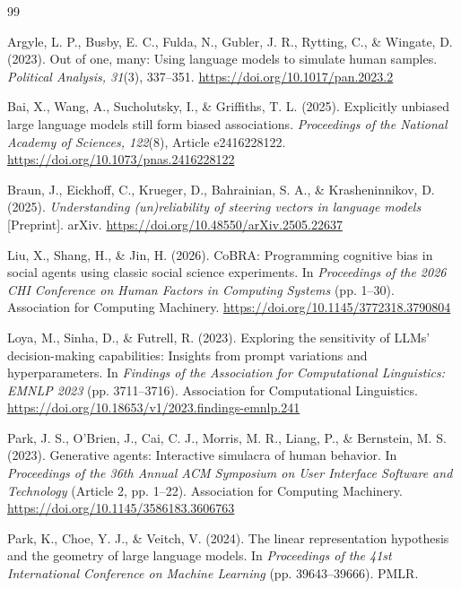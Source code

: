 \documentclass[onecolumn]{main}
\begin{document}
\begin{thebibliography}{99}
\setlength{\bibhang}{0.5in}

Argyle, L. P., Busby, E. C., Fulda, N., Gubler, J. R., Rytting, C., \& Wingate, D. (2023). Out of one, many: Using language models to simulate human samples. \textit{Political Analysis, 31}(3), 337--351. \url{https://doi.org/10.1017/pan.2023.2}

Bai, X., Wang, A., Sucholutsky, I., \& Griffiths, T. L. (2025). Explicitly unbiased large language models still form biased associations. \textit{Proceedings of the National Academy of Sciences, 122}(8), Article e2416228122. \url{https://doi.org/10.1073/pnas.2416228122}

Braun, J., Eickhoff, C., Krueger, D., Bahrainian, S. A., \& Krasheninnikov, D. (2025). \textit{Understanding (un)reliability of steering vectors in language models} [Preprint]. arXiv. \url{https://doi.org/10.48550/arXiv.2505.22637}

Liu, X., Shang, H., \& Jin, H. (2026). CoBRA: Programming cognitive bias in social agents using classic social science experiments. In \textit{Proceedings of the 2026 CHI Conference on Human Factors in Computing Systems} (pp. 1--30). Association for Computing Machinery. \url{https://doi.org/10.1145/3772318.3790804}

Loya, M., Sinha, D., \& Futrell, R. (2023). Exploring the sensitivity of LLMs' decision-making capabilities: Insights from prompt variations and hyperparameters. In \textit{Findings of the Association for Computational Linguistics: EMNLP 2023} (pp. 3711--3716). Association for Computational Linguistics. \url{https://doi.org/10.18653/v1/2023.findings-emnlp.241}

Park, J. S., O'Brien, J., Cai, C. J., Morris, M. R., Liang, P., \& Bernstein, M. S. (2023). Generative agents: Interactive simulacra of human behavior. In \textit{Proceedings of the 36th Annual ACM Symposium on User Interface Software and Technology} (Article 2, pp. 1--22). Association for Computing Machinery. \url{https://doi.org/10.1145/3586183.3606763}

Park, K., Choe, Y. J., \& Veitch, V. (2024). The linear representation hypothesis and the geometry of large language models. In \textit{Proceedings of the 41st International Conference on Machine Learning} (pp. 39643--39666). PMLR.


\end{thebibliography}
\end{document}
